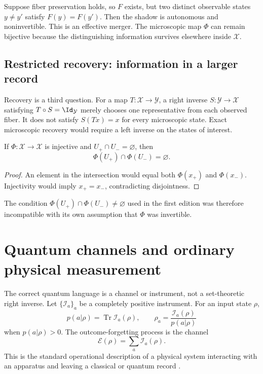 \documentclass[11pt]{article}
\newcommand{\X}{\mathcal X}
\newcommand{\Y}{\mathcal Y}
\newcommand{\E}{\mathcal E}
\begin{document}
Suppose fiber preservation holds, so $F$ exists, but two distinct observable
states $y\neq y'$ satisfy $F(y)=F(y')$. Then the shadow is autonomous and
noninvertible. This is an effective merger. The microscopic map $\Phi$ can
remain bijective because the distinguishing information survives elsewhere
inside $\X$.

\subsection{Restricted recovery: information in a larger record}

Recovery is a third question. For a map $T:\X\to\Y$, a right inverse
$S:\Y\to\X$ satisfying $T\circ S=\Id_\Y$ merely chooses one representative
from each observed fiber. It does not satisfy $S(Tx)=x$ for every microscopic
state. Exact microscopic recovery would require a left inverse on the states
of interest.

\begin{proposition}
\label{prop:disjoint}
If $\Phi:\X\to\X$ is injective and $U_+\cap U_-=\varnothing$, then
\[
 \Phi(U_+)\cap\Phi(U_-)=\varnothing.
\]
\end{proposition}

\begin{proof}
An element in the intersection would equal both $\Phi(x_+)$ and $\Phi(x_-)$.
Injectivity would imply $x_+=x_-$, contradicting disjointness.
\end{proof}

The condition $\Phi(U_+)\cap\Phi(U_-)\neq\varnothing$ used in the first
edition was therefore incompatible with its own assumption that $\Phi$ was
invertible.

\section{Quantum channels and ordinary physical measurement}

The correct quantum language is a channel or instrument, not a set-theoretic
right inverse. Let $\{\mathcal I_a\}_a$ be a completely positive instrument.
For an input state $\rho$,
\[
 p(a|\rho)=\operatorname{Tr}\mathcal I_a(\rho),
 \qquad
 \rho_a=\frac{\mathcal I_a(\rho)}{p(a|\rho)}
\]
when $p(a|\rho)>0$. The outcome-forgetting process is the channel
\[
 \E(\rho)=\sum_a\mathcal I_a(\rho).
\]
This is the standard operational description of a physical system interacting
with an apparatus and leaving a classical or quantum record
\cite{DaviesLewis1970,Ozawa1984}.
\end{document}
